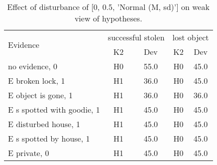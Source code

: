 \begin{table}\begin{tabular}{l|cc|cc}\toprule\multirow{2}{*}{Evidence} & \multicolumn{2}{c}{successful stolen}& \multicolumn{2}{c}{lost object}\\& {K2} & {Dev}& {K2} & {Dev}\\\midrule
no evidence, 0 & \cellcolor{Bittersweet}H0&\cellcolor{Bittersweet}55.0&\cellcolor{Bittersweet}H0&\cellcolor{Bittersweet}45.0\\E broken lock, 1 & \cellcolor{Bittersweet}H1&\cellcolor{Bittersweet}36.0&\cellcolor{Bittersweet}H0&\cellcolor{Bittersweet}45.0\\E object is gone, 1 & \cellcolor{Bittersweet}H1&\cellcolor{Bittersweet}36.0&\cellcolor{Bittersweet}H0&\cellcolor{Bittersweet}36.0\\E s spotted with goodie, 1 & \cellcolor{Bittersweet}H1&\cellcolor{Bittersweet}45.0&\cellcolor{Bittersweet}H0&\cellcolor{Bittersweet}45.0\\E disturbed house, 1 & \cellcolor{Bittersweet}H1&\cellcolor{Bittersweet}45.0&\cellcolor{Bittersweet}H0&\cellcolor{Bittersweet}45.0\\E s spotted by house, 1 & \cellcolor{Bittersweet}H1&\cellcolor{Bittersweet}45.0&\cellcolor{Bittersweet}H0&\cellcolor{Bittersweet}45.0\\E private, 0 & \cellcolor{Bittersweet}H1&\cellcolor{Bittersweet}45.0&\cellcolor{Bittersweet}H0&\cellcolor{Bittersweet}45.0\\\bottomrule\end{tabular}\caption{Effect of disturbance of [0, 0.5, 'Normal (M, sd)'] on weak view of hypotheses.}\end{table}